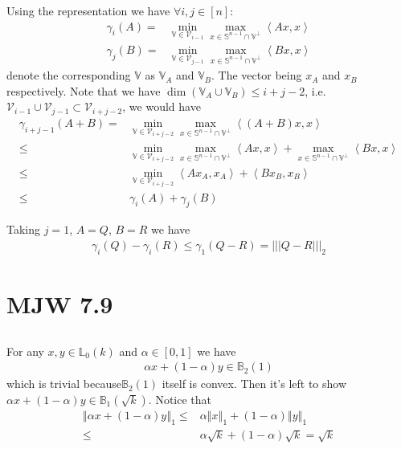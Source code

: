 \documentclass[11pt,a4paper]{ctexart}
\numberwithin{equation}{section}%
\begin{document}
Using the representation we have $ \forall i,j\in[n] $:
\begin{align*}
    \gamma _i(A) = & \mathop{ \min }\limits_{\mathbb{V}\in\mathcal{V}_{i-1}}  \mathop{ \max  }\limits_{x\in \mathbb{S}^{n-1} \cap \mathbb{V}^\perp} \left\langle Ax,x \right\rangle  \\
    \gamma _j(B) = & \mathop{ \min }\limits_{\mathbb{V}\in\mathcal{V}_{j-1}}  \mathop{ \max  }\limits_{x\in \mathbb{S}^{n-1} \cap \mathbb{V}^\perp} \left\langle Bx,x \right\rangle
\end{align*}
denote the corresponding $ \mathbb{V} $ as $ \mathbb{V}_A $ and $ \mathbb{V}_B $. The vector being $ x_A $ and $ x_B $ respectively.
Note that we have $ \dim ( \mathbb{V}_A\cup \mathbb{V}_B)\leq i+j-2 $, i.e. $ \mathcal{V}_{i-1}\cup \mathcal{V}_{j-1}\subset \mathcal{V}_{i+j-2} $, we would have
\begin{align*}
    \gamma _{i+j-1}(A+B) = & \mathop{ \min }\limits_{\mathbb{V}\in\mathcal{V}_{i+j-2}}  \mathop{ \max  }\limits_{x\in \mathbb{S}^{n-1} \cap \mathbb{V}^\perp} \left\langle (A+B)x,x \right\rangle \\
    \leq & \mathop{ \min }\limits_{\mathbb{V}\in\mathcal{V}_{i+j-2}}  \mathop{ \max  }\limits_{x\in \mathbb{S}^{n-1} \cap \mathbb{V}^\perp} \left\langle Ax,x \right\rangle + \mathop{ \max  }\limits_{x\in \mathbb{S}^{n-1} \cap \mathbb{V}^\perp} \left\langle Bx,x \right\rangle \\
    \leq & \mathop{ \min }\limits_{\mathbb{V}\in\mathcal{V}_{i+j-2}}  \left\langle Ax_A,x_A \right\rangle + \left\langle Bx_B,x_B \right\rangle \\
    \leq & \gamma _i(A) + \gamma _j(B)
\end{align*}

Taking $ j=1 $, $ A=Q $, $ B=R $ we have
\begin{align*}
     \gamma _i(Q)-\gamma _i(R) \leq \gamma _1(Q-R) = |||Q-R|||_2
\end{align*}


 
\section{MJW 7.9}

\subsection{}
For any $ x,y \in \mathbb{L}_0(k)$ and $ \alpha \in [0,1] $ we have
\begin{align*}
    \alpha x+(1-\alpha )y \in \mathbb{B}_2(1)  
\end{align*}
which is trivial because$ \mathbb{B}_2(1) $ itself is convex. Then it's left to show $ \alpha x+(1-\alpha )y\in \mathbb{B}_1(\sqrt{k}) $. Notice that 
\begin{align*}
    \left\Vert \alpha x+(1-\alpha )y \right\Vert _1 \leq & \alpha \left\Vert x \right\Vert _1 + (1-\alpha )\left\Vert y \right\Vert _1 \\
    \leq & \alpha \sqrt{k} + (1-\alpha )\sqrt{k} = \sqrt{k}
\end{align*}
\end{document}
